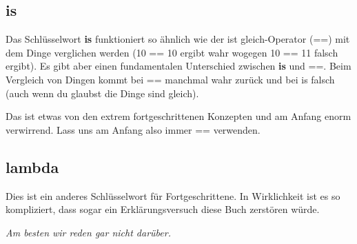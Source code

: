 \subsection*{is}

Das Schlüsselwort \textbf{is} funktioniert so ähnlich wie der ist gleich-Operator (==) mit dem Dinge verglichen werden (10 == 10 ergibt wahr wogegen 10 == 11 falsch ergibt). Es gibt aber einen fundamentalen Unterschied zwischen \textbf{is} und ==. Beim Vergleich von Dingen kommt bei == manchmal wahr zurück und bei is falsch (auch wenn du glaubst die Dinge sind gleich).
\par
Das ist etwas von den extrem fortgeschrittenen Konzepten und am Anfang enorm verwirrend. Lass uns am Anfang also immer == verwenden.

\subsection*{lambda}

Dies ist ein anderes Schlüsselwort für Fortgeschrittene. In Wirklichkeit ist es so kompliziert, dass sogar ein Erklärungsversuch diese Buch zerstören würde.
\par
\emph{Am besten wir reden gar nicht darüber.}

